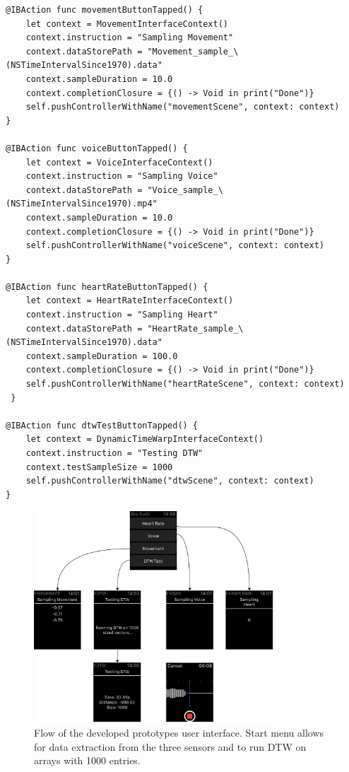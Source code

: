 \begin{lstlisting}[label={lst:ui}, caption={Spawning of ViewControllers from the
main interface, passing contexts setting up the sampling.},basicstyle=\small]
@IBAction func movementButtonTapped() {
    let context = MovementInterfaceContext()
    context.instruction = "Sampling Movement"
    context.dataStorePath = "Movement_sample_\(NSTimeIntervalSince1970).data"
    context.sampleDuration = 10.0
    context.completionClosure = {() -> Void in print("Done")}
    self.pushControllerWithName("movementScene", context: context)
}

@IBAction func voiceButtonTapped() {
    let context = VoiceInterfaceContext()
    context.instruction = "Sampling Voice"
    context.dataStorePath = "Voice_sample_\(NSTimeIntervalSince1970).mp4"
    context.sampleDuration = 10.0
    context.completionClosure = {() -> Void in print("Done")}
    self.pushControllerWithName("voiceScene", context: context)
}

@IBAction func heartRateButtonTapped() {
    let context = HeartRateInterfaceContext()
    context.instruction = "Sampling Heart"
    context.dataStorePath = "HeartRate_sample_\(NSTimeIntervalSince1970).data"
    context.sampleDuration = 100.0
    context.completionClosure = {() -> Void in print("Done")}
    self.pushControllerWithName("heartRateScene", context: context)
 }

@IBAction func dtwTestButtonTapped() {
    let context = DynamicTimeWarpInterfaceContext()
    context.instruction = "Testing DTW"
    context.testSampleSize = 1000
    self.pushControllerWithName("dtwScene", context: context)
}
\end{lstlisting}


\begin{figure}[!h]
\centering
\includegraphics[width=0.8\textwidth]{../media/bioswp_ui.pdf}
\caption{Flow of the developed prototypes user interface. Start menu allows for
data extraction from the three sensors and to run DTW on arrays with 1000
    entries.}
\label{fig:ui}
\end{figure}


